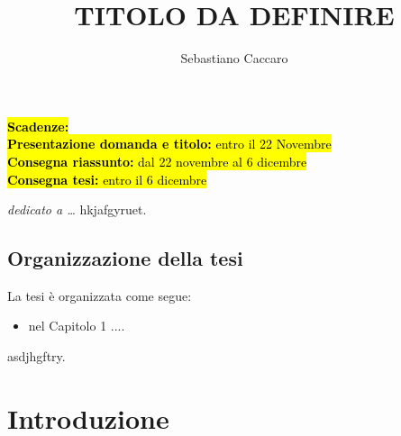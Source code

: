 \documentclass[a4paper,12pt]{report}
\begin{document}
\newcommand{\E}{È}
\noindent
\hl{\textbf{Scadenze:}\\
\textbf{Presentazione domanda e titolo:} entro il 22 Novembre\\
\textbf{Consegna riassunto:} dal 22 novembre al 6 dicembre\\
\textbf{Consegna tesi:} entro il 6 dicembre
}
\title{TITOLO DA DEFINIRE}
\author{Sebastiano Caccaro}
%
% 
%
\beforepreface
\prefacesection{}
        {\hfill \Large {\sl dedicato a \dots}}
% 
%
hkjafgyruet.
%
%
\section*{Organizzazione della tesi}
\label{organizzazione}
La tesi \`e organizzata come segue:
\begin{itemize}
\item nel Capitolo 1 ....
\end{itemize}
%
%
asdjhgftry.
\afterpreface
% 
% 
\chapter{Introduzione}
\label{sec:intro}



%
%
%
\end{document}

